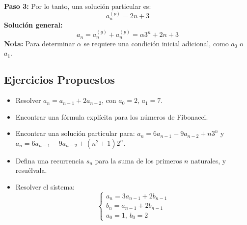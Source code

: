 \noindent \textbf{Paso 3:} Por lo tanto, una solución particular es:
\[
a_n^{(p)} = 2n + 3
\]
\textbf{Solución general:}
\[
a_n = a_n^{(g)} + a_n^{(p)} = \alpha 3^n + 2n + 3
\]
\textbf{Nota:} Para determinar $\alpha$ se requiere una condición inicial adicional, como $a_0$ o $a_1$.


\subsection{Ejercicios Propuestos}

\begin{itemize}
    \item Resolver $a_n = a_{n-1} + 2a_{n-2}$, con $a_0 = 2$, $a_1 = 7$.
    \item Encontrar una fórmula explícita para los números de Fibonacci.
    \item Encontrar una solución particular para: $a_n = 6 a_{n-1} - 9 a_{n-2} + n 3^n$ y $a_n = 6 a_{n-1} - 9 a_{n-2} + (n^2 + 1) 2^n$.
    \item Defina una recurrencia $s_n$ para la suma de los primeros $n$ naturales, y resuélvala.
    \item Resolver el sistema:
    \[
    \begin{cases}
    a_n = 3a_{n-1} + 2b_{n-1} \\
    b_n = a_{n-1} + 2b_{n-1} \\
    a_0 = 1,\ b_0 = 2
    \end{cases}
    \]
\end{itemize}
